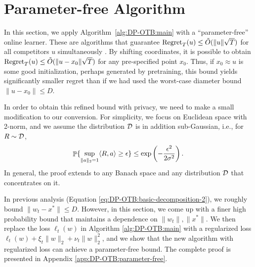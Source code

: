 \section{Parameter-free Algorithm}
\label{sec:DP-OTB_parameter-free}

In this section, we apply Algorithm~\ref{alg:DP-OTB:main} with a ``parameter-free'' online learner. These are algorithms that guarantee $\regret_T(u)\le \tilde O(\|u\|\sqrt{T})$ for all competitors $u$ simultaneously \citep{orabona2016coin, cutkosky2018black, mhammedi2020lipschitz}. By shifting coordinates, it is possible to obtain $\regret_T(u)\le \tilde O(\|u-x_0\|\sqrt{T})$ for any pre-specified point $x_0$. Thus, if $x_0\approx u$ is some good initialization, perhaps generated by pretraining, this bound yields significantly smaller regret than if we had used the worst-case diameter bound $\|u-x_0\|\le D$.

In order to obtain this refined bound with  privacy, we need to make a small modification to our conversion. For simplicity, we focus on Euclidean space with 2-norm, and we assume the distribution $\calD$ is in addition sub-Gaussian, i.e., for $R\sim \calD$,
\begin{align*}
    \P\{\sup_{\|a\|_2=1} \langle R, a\rangle \geq \epsilon \} \leq \exp\left(-\frac{\epsilon^2}{2\sigma^2}\right).
\end{align*}
In general, the proof extends to any Banach space and any distribution $\calD$ that concentrates on it.

In previous analysis (Equation \eqref{eq:DP-OTB:basic-decomposition-2}), we roughly bound $\|w_t-x^*\|\leq D$. However, in this section, we come up with a finer high probability bound that maintains a dependence on $\|w_t\|, \|x^*\|$. We then replace the loss $\ell_t(w)$ in Algorithm \ref{alg:DP-OTB:main} with a regularized loss $\ell_t(w)+\xi_t\|w\|_2+\nu_t\|w\|_2^2$, and we show that the new algorithm with regularized loss can achieve a parameter-free bound. The complete proof is presented in Appendix \ref{app:DP-OTB:parameter-free}.

